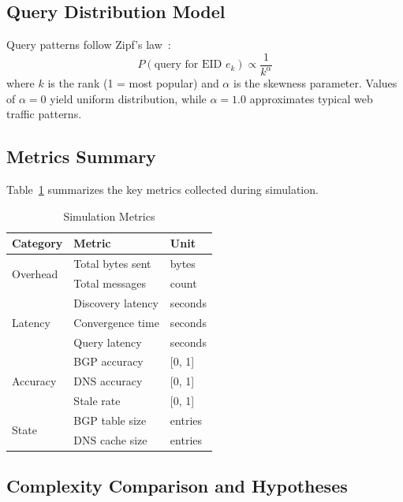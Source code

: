 \documentclass[journal,twocolumn]{IEEEtran}
\begin{document}
\subsection{Query Distribution Model}
\label{sec_query_distribution}

Query patterns follow Zipf's law~\cite{breslau1999web}:
\begin{equation}
P(\text{query for EID } e_k) \propto \frac{1}{k^\alpha}
\end{equation}
where $k$ is the rank (1 = most popular) and $\alpha$ is the skewness parameter. Values of $\alpha = 0$ yield uniform distribution, while $\alpha = 1.0$ approximates typical web traffic patterns.

\subsection{Metrics Summary}
\label{sec_metrics}

Table~\ref{tab:metrics} summarizes the key metrics collected during simulation.

\begin{table}[t]
\centering
\caption{Simulation Metrics}
\label{tab:metrics}
\begin{tabular}{@{}lll@{}}
\toprule
\textbf{Category} & \textbf{Metric} & \textbf{Unit} \\
\midrule
\multirow{2}{*}{Overhead} & Total bytes sent & bytes \\
                          & Total messages & count \\
\midrule
\multirow{3}{*}{Latency} & Discovery latency & seconds \\
                         & Convergence time & seconds \\
                         & Query latency & seconds \\
\midrule
\multirow{3}{*}{Accuracy} & BGP accuracy & [0, 1] \\
                          & DNS accuracy & [0, 1] \\
                          & Stale rate & [0, 1] \\
\midrule
\multirow{2}{*}{State} & BGP table size & entries \\
                       & DNS cache size & entries \\
\bottomrule
\end{tabular}
\end{table}

\subsection{Complexity Comparison and Hypotheses}
\label{sec_complexity}
\end{document}
